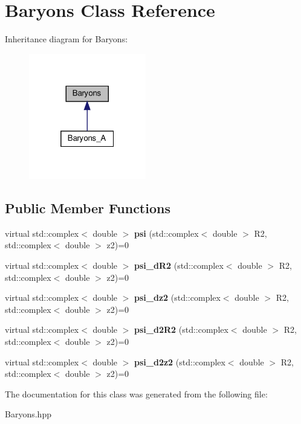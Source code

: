 \hypertarget{classBaryons}{}\section{Baryons Class Reference}
\label{classBaryons}


Inheritance diagram for Baryons\+:\nopagebreak
\begin{figure}[H]
\begin{center}
\leavevmode
\includegraphics[width=145pt]{classBaryons__inherit__graph}
\end{center}
\end{figure}
\subsection*{Public Member Functions}
\begin{DoxyCompactItemize}
\item 
\mbox{\label{classBaryons_afa6c0ccfacd4753da73f97858a5c94e3}} 
virtual std\+::complex$<$ double $>$ {\bfseries psi} (std\+::complex$<$ double $>$ R2, std\+::complex$<$ double $>$ z2)=0
\item 
\mbox{\label{classBaryons_aa0605528752cc4d3c379dccb1bb5cf06}} 
virtual std\+::complex$<$ double $>$ {\bfseries psi\+\_\+d\+R2} (std\+::complex$<$ double $>$ R2, std\+::complex$<$ double $>$ z2)=0
\item 
\mbox{\label{classBaryons_a91cdd21fd446a5ad96a981c670419cc6}} 
virtual std\+::complex$<$ double $>$ {\bfseries psi\+\_\+dz2} (std\+::complex$<$ double $>$ R2, std\+::complex$<$ double $>$ z2)=0
\item 
\mbox{\label{classBaryons_a1bc5232da511f859c5bfe3b6657d4097}} 
virtual std\+::complex$<$ double $>$ {\bfseries psi\+\_\+d2\+R2} (std\+::complex$<$ double $>$ R2, std\+::complex$<$ double $>$ z2)=0
\item 
\mbox{\label{classBaryons_af168376fa16aa35bdb0852bbf5ed4c8c}} 
virtual std\+::complex$<$ double $>$ {\bfseries psi\+\_\+d2z2} (std\+::complex$<$ double $>$ R2, std\+::complex$<$ double $>$ z2)=0
\end{DoxyCompactItemize}


The documentation for this class was generated from the following file\+:\begin{DoxyCompactItemize}
\item 
Baryons.\+hpp\end{DoxyCompactItemize}
